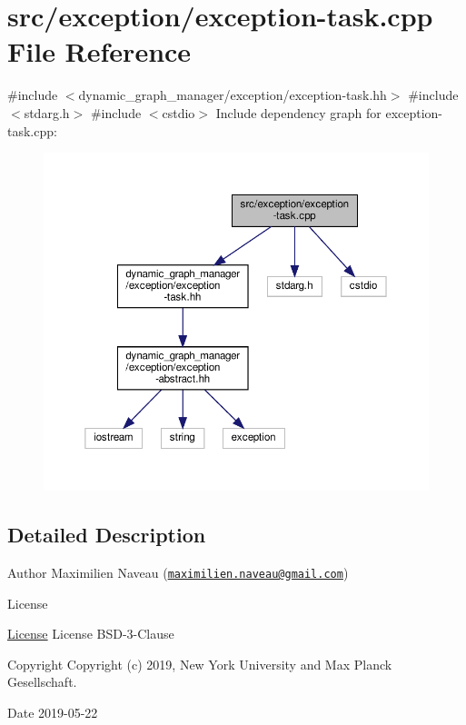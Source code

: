\hypertarget{exception-task_8cpp}{}\section{src/exception/exception-\/task.cpp File Reference}
\label{exception-task_8cpp}
{\ttfamily \#include $<$dynamic\+\_\+graph\+\_\+manager/exception/exception-\/task.\+hh$>$}\newline
{\ttfamily \#include $<$stdarg.\+h$>$}\newline
{\ttfamily \#include $<$cstdio$>$}\newline
Include dependency graph for exception-\/task.cpp\+:
\nopagebreak
\begin{figure}[H]
\begin{center}
\leavevmode
\includegraphics[width=350pt]{exception-task_8cpp__incl}
\end{center}
\end{figure}


\subsection{Detailed Description}
\begin{DoxyAuthor}{Author}
Maximilien Naveau (\href{mailto:maximilien.naveau@gmail.com}{\tt maximilien.\+naveau@gmail.\+com}) 
\end{DoxyAuthor}
\begin{DoxyRefDesc}{License}
\item[\hyperlink{license__license000049}{License}]License B\+S\+D-\/3-\/\+Clause \end{DoxyRefDesc}
\begin{DoxyCopyright}{Copyright}
Copyright (c) 2019, New York University and Max Planck Gesellschaft. 
\end{DoxyCopyright}
\begin{DoxyDate}{Date}
2019-\/05-\/22 
\end{DoxyDate}
